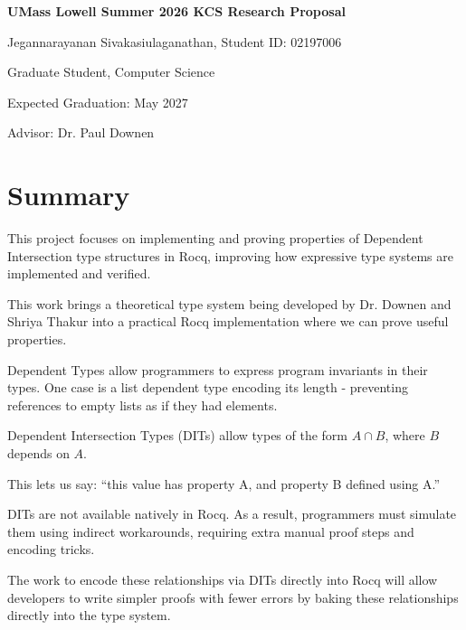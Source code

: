 \documentclass[11pt]{article}
\begin{document}
\begin{center}
    {\LARGE \textbf{UMass Lowell Summer 2026 KCS Research Proposal}} 
    
    \vspace{0.5em}
    
    {\large Jegannarayanan Sivakasiulaganathan, Student ID: 02197006}
    
    \vspace{0.25em}
    
    {\large Graduate Student, Computer Science}
    \vspace{0.25em}

    {\large Expected Graduation: May 2027}

    
    \vspace{0.25em}
    
    {\large Advisor: Dr. Paul Downen}
\end{center}

\vspace{1.5em}
\section*{Summary}

This project focuses on implementing and proving properties of Dependent 
Intersection type structures in Rocq, improving how expressive type systems 
are implemented and verified.

This work brings a theoretical type system being developed by Dr. Downen and 
Shriya Thakur into a practical Rocq implementation where we can prove useful properties.

Dependent Types allow programmers to express program invariants in their types.
One case is a list dependent type encoding its length - preventing references to 
empty lists as if they had elements.

Dependent Intersection Types (DITs) allow types of the form $A \cap B$, where $B$ depends on $A$.

This lets us say: “this value has property A, and property B defined using A.”

DITs are not available natively in Rocq. As a result, 
programmers must simulate them using indirect workarounds, requiring extra 
manual proof steps and encoding tricks.

The work to encode these relationships via DITs directly into Rocq will
allow developers to write simpler proofs with fewer errors by baking these 
relationships directly into the type system.
\end{document}
